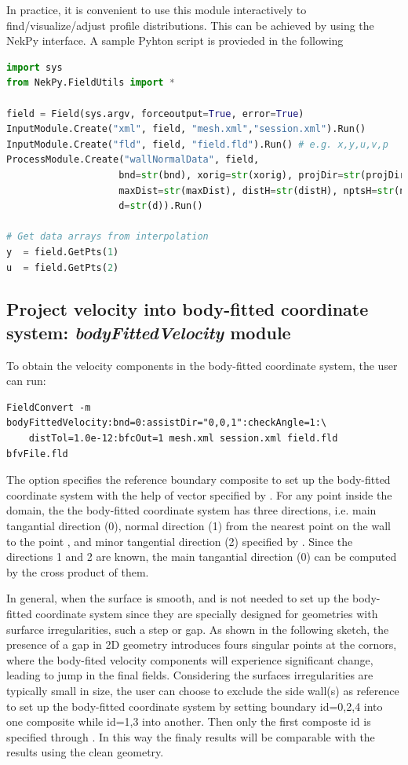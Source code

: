 In practice, it is convenient to use this module interactively to find/visualize/adjust profile distributions.
This can be achieved by using the NekPy interface. A sample Pyhton script is provieded in the following
\begin{lstlisting}[style=C++Style, language=Python]
import sys
from NekPy.FieldUtils import *

field = Field(sys.argv, forceoutput=True, error=True)
InputModule.Create("xml", field, "mesh.xml","session.xml").Run()
InputModule.Create("fld", field, "field.fld").Run() # e.g. x,y,u,v,p
ProcessModule.Create("wallNormalData", field,
                    bnd=str(bnd), xorig=str(xorig), projDir=str(projDir),
                    maxDist=str(maxDist), distH=str(distH), nptsH=str(nptsH),
                    d=str(d)).Run()

# Get data arrays from interpolation
y  = field.GetPts(1) 
u  = field.GetPts(2)
\end{lstlisting}





%
%
%

\subsection{Project velocity into body-fitted coordinate system: 
\textit{bodyFittedVelocity} module}
\label{s:utilities:fieldconvert:sub:bodyFittedVelocity}
To obtain the velocity components in the body-fitted coordinate system, the user
can run:
\begin{lstlisting}[style=BashInputStyle]
FieldConvert -m bodyFittedVelocity:bnd=0:assistDir="0,0,1":checkAngle=1:\
    distTol=1.0e-12:bfcOut=1 mesh.xml session.xml field.fld bfvFile.fld  
\end{lstlisting}
The option  specifies the reference boundary composite to set up
the body-fitted coordinate system with the help of vector specified by 
\inltt{assistDir}. For any point inside the domain, the the body-fitted coordinate 
system has three directions, i.e. main tangantial direction (0), normal direction
(1) from the nearest point on the wall to the point , and minor tangential direction
(2) specified by \inltt{assistDir}. Since the directions 1 and 2 are known, the main
tangantial direction (0) can be computed by the cross product of them.

In general, when the surface is smooth,  and  is
not needed to set up the body-fitted coordinate system since they are specially
designed for geometries with surfarce irregularities, such a step or gap. As shown
in the following sketch, the presence of a gap in 2D geometry introduces fours
singular points at the cornors, where the body-fited velocity components will 
experience significant change, leading to jump in the final fields. Considering 
the surfaces irregularities are typically small in size, the user can choose to 
exclude the side wall(s) as reference to set up the body-fitted coordinate system
by setting boundary id=0,2,4 into one composite while id=1,3 into another. Then only
the first composte id is specified through \inltt{bnd}. In this way the finaly results
will be comparable with the results using the clean geometry.

